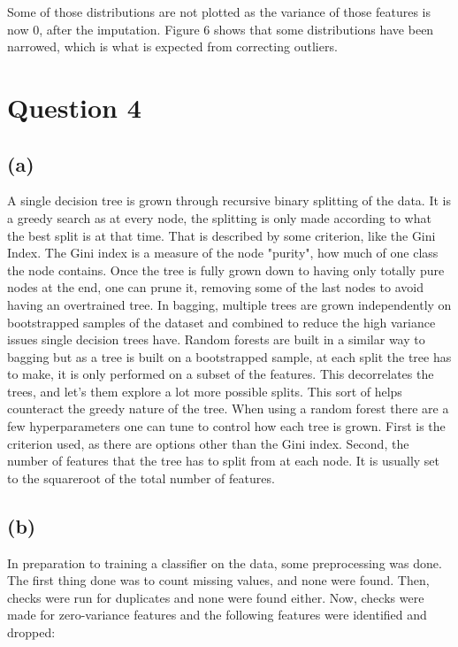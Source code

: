 \documentclass[12pt]{report} %
\begin{document}
Some of those distributions are not plotted as the variance of those features is now 0, after the imputation. Figure 6 shows that some distributions have been narrowed, which is what is expected from correcting outliers.

\newpage
\section*{Question 4}

\subsection*{(a)}

A single decision tree is grown through recursive binary splitting of the data. It is a greedy search as at every node, the splitting is only made according to what the best split is at that time\cite[pp. 337-338]{james2013introduction}. That is described by some criterion, like the Gini Index. The Gini index is a measure of the node "purity", how much of one class the node contains\cite[pp. 338-339]{james2013introduction}. Once the tree is fully grown down to having only totally pure nodes at the end, one can prune it, removing some of the last nodes to avoid having an overtrained tree. In bagging, multiple trees are grown independently on bootstrapped samples of the dataset and combined to reduce the high variance issues single decision trees have\cite[p. 343]{james2013introduction}. Random forests are built in a similar way to bagging but as a tree is built on a bootstrapped sample, at each split the tree has to make, it is only performed on a subset of the features. This decorrelates the trees, and let's them explore a lot more possible splits\cite[354]{james2013introduction}. This sort of helps counteract the greedy nature of the tree. When using a random forest there are a few hyperparameters one can tune to control how each tree is grown. First is the criterion used, as there are options other than the Gini index. Second, the number of features that the tree has to split from at each node. It is usually set to the squareroot of the total number of features.

\subsection*{(b)}

In preparation to training a classifier on the data, some preprocessing was done. The first thing done was to count missing values, and none were found. Then, checks were run for duplicates and none were found either. Now, checks were made for zero-variance features and the following features were identified and dropped:
\end{document}
